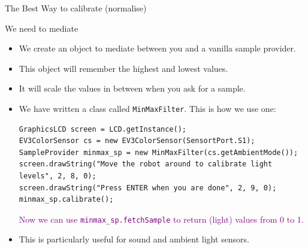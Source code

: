 \documentclass[color=pdftex,usenames,dvipsnames, aspectratio=169]{beamer}
\begin{document}
\begin{frame}[fragile]{The Best Way to calibrate (normalise)}
\begin{block}{We need to mediate}
\begin{itemize}
\item We \alert{create an object} to mediate between you and a vanilla sample provider.

\item This object will remember the highest and lowest values.
\item It will scale the values in between when you ask for a sample.
\item We have written a class called \lstinline!MinMaxFilter!.  This is how we use one:

\begin{lstlisting}[emph={calibrate,MinMaxFilter},basicstyle=\ttfamily\footnotesize\color{blue},linewidth=0.9\textwidth]
GraphicsLCD screen = LCD.getInstance();
EV3ColorSensor cs = new EV3ColorSensor(SensortPort.S1);
SampleProvider minmax_sp = new MinMaxFilter(cs.getAmbientMode());
screen.drawString("Move the robot around to calibrate light levels", 2, 8, 0);
screen.drawString("Press ENTER when you are done", 2, 9, 0);
minmax_sp.calibrate();
\end{lstlisting}

\textcolor{purple}{Now we can use \lstinline!minmax_sp.fetchSample! to return (light) values from 0 to 1.}

\item \textcolor{OliveGreen}{This is particularly useful for sound and ambient light sensors.}
\end{itemize}
\end{block}
\end{frame}
\end{document}
